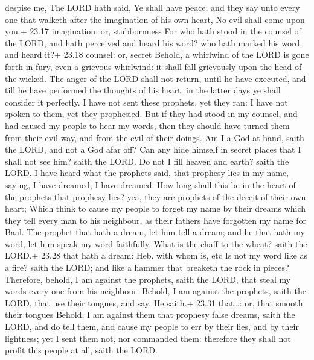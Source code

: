 despise me, The LORD hath said, Ye shall have peace; and they say unto
every one that walketh after the imagination of his own heart, No evil
shall come upon you.+ 23.17 imagination: or, stubbornness 
For who hath stood in the counsel of the LORD, and hath perceived and
heard his word? who hath marked his word, and heard it?+ 23.18 counsel:
or, secret  Behold, a whirlwind of the LORD is gone forth
in fury, even a grievous whirlwind: it shall fall grievously upon the
head of the wicked.  The anger of the LORD shall not
return, until he have executed, and till he have performed the thoughts
of his heart: in the latter days ye shall consider it perfectly.
 I have not sent these prophets, yet they ran: I have not
spoken to them, yet they prophesied.  But if they had stood
in my counsel, and had caused my people to hear my words, then they
should have turned them from their evil way, and from the evil of their
doings.  Am I a God at hand, saith the LORD, and not a God
afar off?  Can any hide himself in secret places that I
shall not see him? saith the LORD. Do not I fill heaven and earth? saith
the LORD.  I have heard what the prophets said, that
prophesy lies in my name, saying, I have dreamed, I have dreamed.
 How long shall this be in the heart of the prophets that
prophesy lies? yea, they are prophets of the deceit of their own heart;
 Which think to cause my people to forget my name by their
dreams which they tell every man to his neighbour, as their fathers have
forgotten my name for Baal.  The prophet that hath a dream,
let him tell a dream; and he that hath my word, let him speak my word
faithfully. What is the chaff to the wheat? saith the LORD.+ 23.28 that
hath a dream: Heb. with whom is, etc  Is not my word like
as a fire? saith the LORD; and like a hammer that breaketh the rock in
pieces?  Therefore, behold, I am against the prophets,
saith the LORD, that steal my words every one from his neighbour.
 Behold, I am against the prophets, saith the LORD, that
use their tongues, and say, He saith.+ 23.31 that\ldots: or, that smooth
their tongues  Behold, I am against them that prophesy
false dreams, saith the LORD, and do tell them, and cause my people to
err by their lies, and by their lightness; yet I sent them not, nor
commanded them: therefore they shall not profit this people at all,
saith the LORD.

